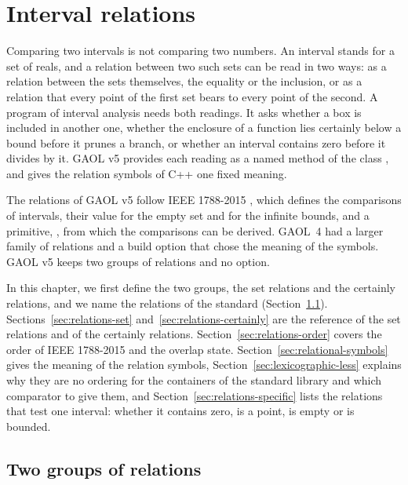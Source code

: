 \documentclass[12pt,a4paper,twoside,openright]{book}
\begin{document}
\chapter{Interval relations}\label{chap:relations}\label{sec:interval-relations}

Comparing two intervals is not comparing two numbers. An interval stands for
a set of reals, and a relation between two such sets can be read in two ways:
as a relation between the sets themselves, the equality or the inclusion, or
as a relation that every point of the first set bears to every point of the
second. A program of interval analysis needs both readings. It asks whether a
box is included in another one, whether the enclosure of a function lies
certainly below a bound before it prunes a branch, or whether an interval
contains zero before it divides by it. GAOL v5 provides each reading as a
named method of the class , and gives the relation symbols of
C++ one fixed meaning.

\medskip
The relations of GAOL v5 follow IEEE 1788-2015 \cite{IEEE1788:2015}, which
defines the comparisons of intervals, their value for the empty set and for
the infinite bounds, and a primitive, , from which the
comparisons can be derived. GAOL~4 had a larger family of relations and a
build option that chose the meaning of the symbols. GAOL v5 keeps two groups
of relations and no option.

\medskip
In this chapter, we first define the two groups, the set relations and the
certainly relations, and we name the relations of the standard
(Section~\ref{sec:relations-groups}). Sections~\ref{sec:relations-set}
and~\ref{sec:relations-certainly} are the reference of the set relations and
of the certainly relations. Section~\ref{sec:relations-order} covers the
order of IEEE 1788-2015 and the overlap state.
Section~\ref{sec:relational-symbols} gives the meaning of the relation
symbols, Section~\ref{sec:lexicographic-less} explains why they are no
ordering for the containers of the standard library and which comparator to
give them, and Section~\ref{sec:relations-specific} lists the relations that
test one interval: whether it contains zero, is a point, is empty or is
bounded.

\section{Two groups of relations}\label{sec:relations-groups}
%
\end{document}
